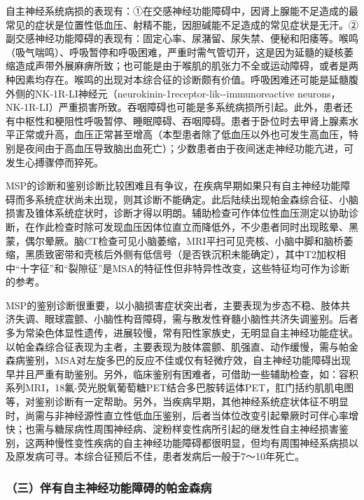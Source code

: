 自主神经系统病损的表现有：①在交感神经功能障碍中，因肾上腺能不足造成的最常见的症状是位置性低血压、射精不能，因胆碱能不足造成的常见症状是无汗。②副交感神经功能障碍的表现有：固定心率、尿潴留、尿失禁、便秘和阳痿等。喉鸣（吸气喘鸣）、呼吸暂停和呼吸困难，严重时需气管切开，这是因为延髓的疑核萎缩造成声带外展麻痹所致；也可能是由于喉肌的肌张力不全或运动障碍，或者是两种因素均存在。喉鸣的出现对本综合征的诊断颇有价值。呼吸困难还可能是延髓腹外侧的NK-1R-LI神经元（neurokinin-1receptor-lik-\/-immunoreactive
neurons，NK-1R-LI）严重损害所致。吞咽障碍也可能是多系统病损所引起。此外，患者还有中枢性和梗阻性呼吸暂停、睡眠障碍、吞咽障碍。患者于卧位时去甲肾上腺素水平正常或升高，血压正常甚至增高（本型患者除了低血压以外也可发生高血压，特别是夜间由于高血压导致脑出血死亡）；少数患者由于夜间迷走神经功能亢进，可发生心搏骤停而猝死。

MSP的诊断和鉴别诊断比较困难且有争议，在疾病早期如果只有自主神经功能障碍而多系统症状尚未出现，则其诊断不能确定。此后陆续出现帕金森综合征、小脑损害及锥体系统症状时，诊断才得以明朗。辅助检查可作体位性血压测定以协助诊断，在作此检查时除可发现血压因体位直立而降低外，不少患者同时出现眩晕、黑蒙，偶尔晕厥。脑CT检查可见小脑萎缩，MRI平扫可见壳核、小脑中脚和脑桥萎缩，黑质致密带和壳核后外侧有低信号（是否铁沉积未能确定），其中T2加权相中“十字征”和“裂隙征”是MSA的特征性但非特异性改变，这些特征均可作为诊断的参考。

MSP的鉴别诊断很重要，以小脑损害症状突出者，主要表现为步态不稳、肢体共济失调、眼球震颤、小脑性构音障碍，需与散发性脊髓小脑性共济失调鉴别。后者多为常染色体显性遗传，进展较慢，常有阳性家族史，无明显自主神经功能症状。以帕金森综合征表现为主者，主要表现为肢体震颤、肌强直、动作缓慢，需与帕金森病鉴别，MSA对左旋多巴的反应不佳或仅有轻微疗效，自主神经功能障碍出现早并且严重有助鉴别。另外，临床鉴别有困难者，可借助一些辅助检查，如：容积系列MRI，18氟-荧光脱氧葡萄糖PET结合多巴胺转运体PET，肛门括约肌肌电图等，对鉴别诊断有一定帮助。另外，当疾病早期，其他神经系统症状体征不明显时，尚需与非神经源性直立性低血压鉴别，后者当体位改变引起晕厥时可伴心率增快；也需与糖尿病性周围神经病、淀粉样变性病所引起的继发性自主神经损害鉴别，这两种慢性变性疾病的自主神经功能障碍都很明显，但均有周围神经系病损以及原发病可寻。本综合征预后不佳，患者发病后一般于7～10年死亡。

\subsubsection{（三）伴有自主神经功能障碍的帕金森病}

